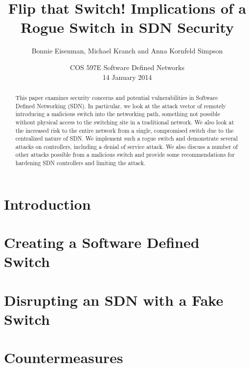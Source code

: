 \documentclass[12pt, letterpaper, twocolumn, twoside]{article}
\title{Flip that Switch! Implications of a Rogue Switch in SDN Security}
\author{Bonnie Eisenman, Michael Kranch and Anna Kornfeld Simpson}
\date{COS 597E Software Defined Networks \\ 14 January 2014}
\begin{document}
\maketitle

\begin{spacing}{1.0}

\begin{abstract}
This paper examines security concerns and potential vulnerabilities in Software Defined Networking (SDN). In particular, we look at the attack vector of remotely introducing a malicious switch into the networking path, something not possible without physical access to the switching site in a traditional network. We also look at the increased risk to the entire network from a single, compromised switch due to the centralized nature of SDN. We implement such a rogue switch and demonstrate several attacks on controllers, including a denial of service attack. We also discuss a number of other attacks possible from a malicious switch and provide some recommendations for hardening SDN controllers and limiting the attack.

\end{abstract}

\section{Introduction}


\section{Creating a Software Defined Switch}
\label{fake}


\section{Disrupting an SDN with a Fake Switch}
\label{attacks}


\section{Countermeasures}
\label{countermeasures}



\end{spacing}
\end{document}
